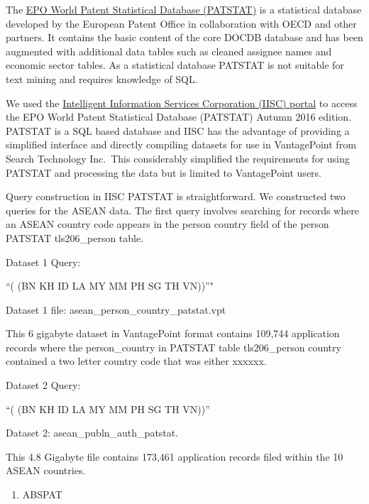 \documentclass[]{book}
\providecommand{\tightlist}{%
  \setlength{\itemsep}{0pt}\setlength{\parskip}{0pt}}
\theoremstyle{definition}
\theoremstyle{definition}
\theoremstyle{definition}
\theoremstyle{remark}
\begin{document}
The
\href{https://www.epo.org/searching-for-patents/business/patstat.html\#tab-1}{EPO
World Patent Statistical Database (PATSTAT)} is a statistical database
developed by the European Patent Office in collaboration with OECD and
other partners. It contains the basic content of the core DOCDB database
and has been augmented with additional data tables such as cleaned
assignee names and economic sector tables. As a statistical database
PATSTAT is not suitable for text mining and requires knowledge of SQL.

We used the
\href{http://www.patstat.org/Patstat/PatstatApp/app/index.html\#/disclaimer}{Intelligent
Information Services Corporation (IISC) portal} to access the EPO World
Patent Statistical Database (PATSTAT) Autumn 2016 edition. PATSTAT is a
SQL based database and IISC has the advantage of providing a simplified
interface and directly compiling datasets for use in VantagePoint from
Search Technology Inc.~This considerably simplified the requirements for
using PATSTAT and processing the data but is limited to VantagePoint
users.

Query construction in IISC PATSTAT is straightforward. We constructed
two queries for the ASEAN data. The first query involves searching for
records where an ASEAN country code appears in the person country field
of the person PATSTAT tls206\_person table.

Dataset 1 Query:

``(\citet{PersonCountry} (BN \textbar{} KH \textbar{} ID \textbar{} LA
\textbar{} MY \textbar{} MM \textbar{} PH \textbar{} SG \textbar{} TH
\textbar{} VN))''"

Dataset 1 file: asean\_person\_country\_patstat.vpt

This 6 gigabyte dataset in VantagePoint format contains 109,744
application records where the person\_country in PATSTAT table
tls206\_person country contained a two letter country code that was
either xxxxxx.

Dataset 2 Query:

``(\citet{PubAuthority} (BN \textbar{} KH \textbar{} ID \textbar{} LA
\textbar{} MY \textbar{} MM \textbar{} PH \textbar{} SG \textbar{} TH
\textbar{} VN))''

Dataset 2: asean\_publn\_auth\_patstat.

This 4.8 Gigabyte file contains 173,461 application records filed within
the 10 ASEAN countries.

\begin{enumerate}
\def\labelenumi{\arabic{enumi}.}
\setcounter{enumi}{1}
\tightlist
\item
  ABSPAT
\end{enumerate}
\end{document}

